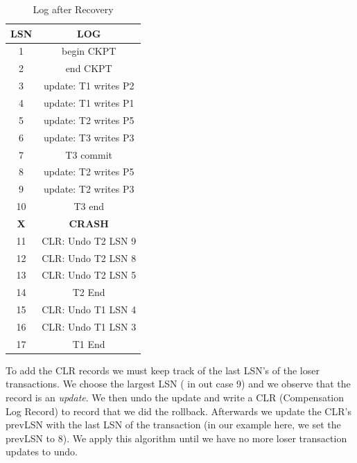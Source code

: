 \documentclass{article}      %
\begin{document}
\begin{enumerate}
\begin{table}[h]
\begin{center}
\begin{tabular}{|c|c|}
\hline
\textbf{LSN} & \textbf{LOG}         \\ \hline
1            & begin CKPT           \\ \hline
2            & end CKPT             \\ \hline
3            & update: T1 writes P2 \\ \hline
4            & update: T1 writes P1 \\ \hline
5            & update: T2 writes P5 \\ \hline
6            & update: T3 writes P3 \\ \hline
7            & T3 commit            \\ \hline
8            & update: T2 writes P5 \\ \hline
9            & update: T2 writes P3 \\ \hline
10           & T3 end               \\ \hline
\textbf{X}   & \textbf{CRASH}       \\ \hline
11           & CLR: Undo T2 LSN 9   \\ \hline
12           & CLR: Undo T2 LSN 8   \\ \hline
13           & CLR: Undo T2 LSN 5   \\ \hline
14           & T2 End               \\ \hline
15           & CLR: Undo T1 LSN 4   \\ \hline
16           & CLR: Undo T1 LSN 3   \\ \hline
17           & T1 End               \\ \hline
\end{tabular}
\caption{Log after Recovery}
\label{Log after Recovery}
\end{center}
\end{table}
\end{enumerate}
To add the CLR records we must keep track of the last LSN's of the loser transactions. We choose the largest LSN ( in out case 9) and we observe that the record is an \emph{update}. We then undo the update and write a CLR (Compensation Log Record) to record that we did the rollback. Afterwards we update the CLR's prevLSN with the last LSN of the transaction (in our example here, we set the prevLSN to 8). We apply this algorithm until we have no more loser transaction updates to undo. \\
\end{document}
